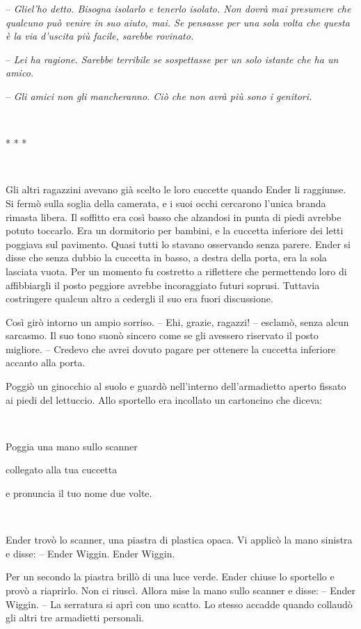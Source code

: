 {-- \emph{Gliel'ho detto. Bisogna isolarlo e tenerlo isolato. Non dovrà
		mai presumere che qualcuno può venire in suo aiuto, mai. Se pensasse per
		una sola volta che questa è la via d'uscita più facile, sarebbe
		rovinato.}}

{-- \emph{Lei ha ragione. Sarebbe terribile se sospettasse per un solo
		istante che ha un amico.}}

{-- \emph{Gli amici non gli mancheranno. Ciò che non avrà più sono i
		genitori.}}

{~}

\begin{center}
	{* * *}
\end{center}

{~}

{Gli altri ragazzini avevano già scelto le loro cuccette quando Ender li
	raggiunse. Si fermò sulla soglia della camerata, e i suoi occhi
	cercarono l'unica branda rimasta libera. Il soffitto era così basso che
	alzandosi in punta di piedi avrebbe potuto toccarlo. Era un dormitorio
	per bambini, e la cuccetta inferiore dei letti poggiava sul pavimento.
	Quasi tutti lo stavano osservando senza parere. Ender si disse che senza
	dubbio la cuccetta in basso, a destra della porta, era la sola lasciata
	vuota. Per un momento fu costretto a riflettere che permettendo loro di
	affibbiargli il posto peggiore avrebbe incoraggiato futuri soprusi.
	Tuttavia costringere qualcun altro a cedergli il suo era fuori
	discussione.}

{Così girò intorno un ampio sorriso. -- Ehi, grazie, ragazzi! --
	esclamò, senza alcun sarcasmo. Il suo tono suonò sincero come se gli
	avessero riservato il posto migliore. -- Credevo che avrei dovuto pagare
	per ottenere la cuccetta inferiore accanto alla porta.}

{Poggiò un ginocchio al suolo e guardò nell'interno dell'armadietto
	aperto fissato ai piedi del lettuccio. Allo sportello era incollato un
	cartoncino che diceva:}

{~}

{Poggia una mano sullo scanner}

{collegato alla tua cuccetta}

{e pronuncia il tuo nome due volte.}

{~}

{Ender trovò lo scanner, una piastra di plastica opaca. Vi applicò la
	mano sinistra e disse: -- Ender Wiggin. Ender Wiggin.}

{Per un secondo la piastra brillò di una luce verde. Ender chiuse lo
	sportello e provò a riaprirlo. Non ci riuscì. Allora mise la mano sullo
	scanner e disse: -- Ender Wiggin. -- La serratura si aprì con uno
	scatto. Lo stesso accadde quando collaudò gli altri tre armadietti
	personali.}

